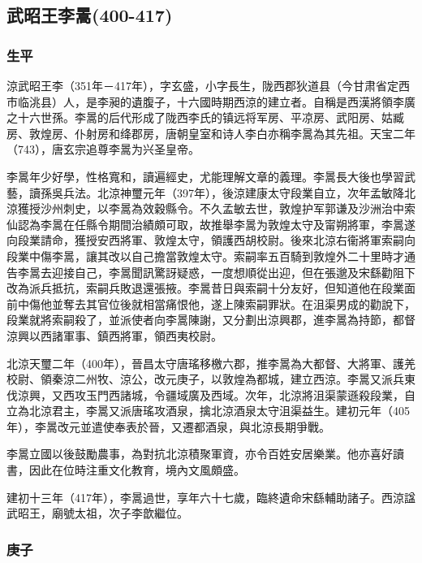 
\subsection{武昭王李暠\tiny(400-417)}

\subsubsection{生平}

涼武昭王李（351年－417年），字玄盛，小字長生，陇西郡狄道县（今甘肃省定西市临洮县）人，是李昶的遺腹子，十六國時期西涼的建立者。自稱是西漢將領李廣之十六世孫。李暠的后代形成了陇西李氏的镇远将军房、平凉房、武阳房、姑臧房、敦煌房、仆射房和绛郡房，唐朝皇室和诗人李白亦稱李暠為其先祖。天宝二年（743），唐玄宗追尊李暠为兴圣皇帝。

李暠年少好學，性格寬和，讀遍經史，尤能理解文章的義理。李暠長大後也學習武藝，讀孫吳兵法。北涼神璽元年（397年），後涼建康太守段業自立，次年孟敏降北涼獲授沙州刺史，以李暠為效穀縣令。不久孟敏去世，敦煌护军郭谦及沙洲治中索仙認為李暠在任縣令期間治績頗可取，故推舉李暠为敦煌太守及甯朔將軍，李暠遂向段業請命，獲授安西將軍、敦煌太守，領護西胡校尉。後來北涼右衞將軍索嗣向段業中傷李暠，讓其改以自己擔當敦煌太守。索嗣率五百騎到敦煌外二十里時才通告李暠去迎接自己，李暠聞訊驚訝疑惑，一度想順從出迎，但在張邈及宋繇勸阻下改為派兵抵抗，索嗣兵敗退還張掖。李暠昔日與索嗣十分友好，但知道他在段業面前中傷他並奪去其官位後就相當痛恨他，遂上陳索嗣罪狀。在沮渠男成的勸說下，段業就將索嗣殺了，並派使者向李暠陳謝，又分劃出涼興郡，進李暠為持節，都督涼興以西諸軍事、鎮西將軍，領西夷校尉。

北涼天璽二年（400年），晉昌太守唐瑤移檄六郡，推李暠為大都督、大將軍、護羌校尉、領秦涼二州牧、涼公，改元庚子，以敦煌為都城，建立西涼。李暠又派兵東伐涼興，又西攻玉門西諸城，令疆域廣及西域。次年，北涼將沮渠蒙遜殺段業，自立為北涼君主，李暠又派唐瑤攻酒泉，擒北涼酒泉太守沮渠益生。建初元年（405年），李暠改元並遣使奉表於晉，又遷都酒泉，與北涼長期爭戰。

李暠立國以後鼓勵農事，為對抗北涼積聚軍資，亦令百姓安居樂業。他亦喜好讀書，因此在位時注重文化教育，境內文風頗盛。

建初十三年（417年），李暠過世，享年六十七歲，臨終遺命宋繇輔助諸子。西涼諡武昭王，廟號太祖，次子李歆繼位。

\subsubsection{庚子}

